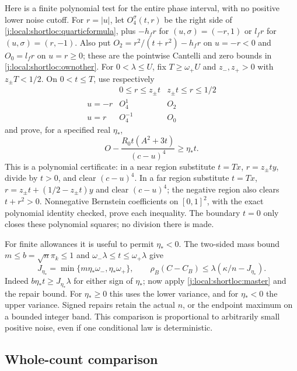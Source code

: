 Here is a finite polynomial test for the entire phase interval, with no
positive lower noise cutoff. For $r=|u|$, let $O_4^\sigma(t,r)$ be the
right side of \eqref{j:local:shortloc:quarticformula}, plus $-h_fr$ for
$(u,\sigma)=(-r,1)$ or $l_fr$ for $(u,\sigma)=(r,-1)$.
Also put $O_2=r^2/(t+r^2)-h_fr$ on $u=-r<0$ and $O_0=l_fr$ on $u=r\ge0$;
these are the pointwise Cantelli and zero bounds in
\eqref{j:local:shortloc:ownother}. For $0<\lambda\le U$, fix
$T\ge\omega_+U$ and $z_-,z_+>0$
with $z_\pm T<1/2$. On $0<t\le T$, use respectively
\[
 \begin{array}{c|cc}
 &0\le r\le z_\pm t&z_\pm t\le r\le1/2\\ \hline
 u=-r&O_4^1&O_2\\
 u=r&O_4^{-1}&O_0
 \end{array}
\]
and prove, for a specified real $\eta_*$,
\begin{equation}\label{j:local:joint-count-loss}
       O-\frac{R_0t(A^2+3t)}{(c-u)^4}\ge\eta_*t.
\end{equation}
This is a polynomial certificate: in a near region substitute
$t=Tx$, $r=z_\pm ty$, divide by $t>0$, and clear $(c-u)^4$.
In a far region substitute
$t=Tx$, $r=z_\pm t+(1/2-z_\pm t)y$ and clear $(c-u)^4$;
the negative region also clears $t+r^2>0$.
Nonnegative Bernstein coefficients on $[0,1]^2$, with the exact
polynomial identity checked, prove each inequality. The boundary $t=0$
only closes these polynomial squares; no division there is made.

For finite allowances it is useful to permit $\eta_*<0$.
The two-sided mass bound $m\le b=\sqrt n\pi_k\le1$ and
$\omega_-\lambda\le t\le\omega_+\lambda$ give
\begin{equation}\label{j:local:joint-count-reserve}
 J_{\eta_*}=\min\{m\eta_*\omega_-,\eta_*\omega_+\},\qquad
 \rho_B(C-C_B)\le\lambda(\kappa/n-J_{\eta_*}).
\end{equation}
Indeed $b\eta_*t\ge J_{\eta_*}\lambda$ for either sign of $\eta_*$;
now apply \eqref{j:local:shortloc:master} and the repair bound.
For $\eta_*\ge0$ this uses the lower variance, and for $\eta_*<0$ the
upper variance. Signed repairs retain the actual $n$, or the endpoint
maximum on a bounded integer band. This comparison is proportional to
arbitrarily small positive noise, even if one conditional law is deterministic.

\subsection{Whole-count comparison}


